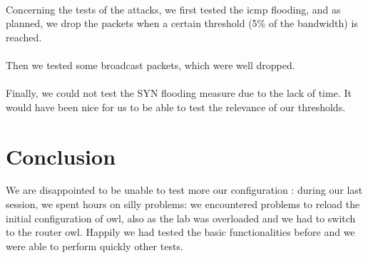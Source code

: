 \documentclass[a4paper,titlepage]{article}
\begin{document}
\paragraph{}Concerning the tests of the attacks, we first tested the icmp flooding, and as planned, we drop the packets when a certain threshold (5\% of the bandwidth) is reached.

\paragraph{}Then we tested some broadcast packets, which were well dropped.
\paragraph{} Finally, we could not test the SYN flooding measure due to the lack of time. It would have been nice for us to be able to test the relevance of our thresholds.

\section{Conclusion}
We are disappointed to be unable to test more our configuration : during our last session, we spent hours on silly problems: we encountered problems to reload the initial configuration of owl, also as the lab was overloaded and we had to switch to the router owl. Happily we had tested the basic functionalities before and we were able to perform quickly other tests.
\end{document}
